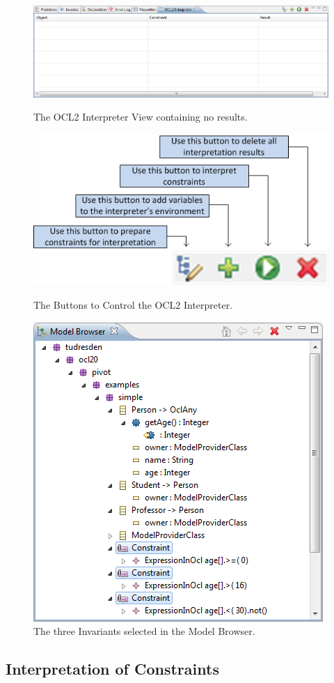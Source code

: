 \begin{figure}[!p]
	\centering
	\includegraphics[width=1.0\linewidth]{figures/interpreter/interpret01}
	\caption{The OCL2 Interpreter View containing no results.}
	\label{pic:interpret:interpret01}

  \vspace{2.0em}
  
	\centering
	\includegraphics[width=0.5\linewidth]{figures/interpreter/interpret02}
	\caption{The Buttons to Control the OCL2 Interpreter.}
	\label{pic:interpret:interpret02}
	
  \vspace{2.0em}

	\centering
	\includegraphics[width=0.6\linewidth]{figures/interpreter/interpret03}
	\caption{The three Invariants selected in the Model Browser.}
	\label{pic:interpret:interpret03}
\end{figure}


\subsection{Interpretation of Constraints}

